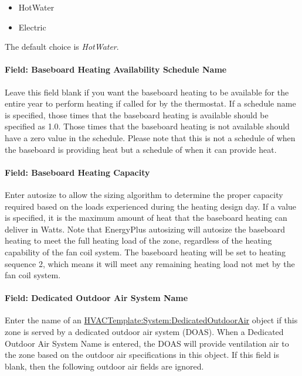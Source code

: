 \begin{itemize}
\item
  HotWater
\item
  Electric
\end{itemize}

The default choice is \emph{HotWater}.

\paragraph{Field: Baseboard Heating Availability Schedule Name}\label{field-baseboard-heating-availability-schedule-name}

Leave this field blank if you want the baseboard heating to be available for the entire year to perform heating if called for by the thermostat. If a schedule name is specified, those times that the baseboard heating is available should be specified as 1.0. Those times that the baseboard heating is not available should have a zero value in the schedule. Please note that this is not a schedule of when the baseboard is providing heat but a schedule of when it can provide heat.

\paragraph{Field: Baseboard Heating Capacity}\label{field-baseboard-heating-capacity}

Enter autosize to allow the sizing algorithm to determine the proper capacity required based on the loads experienced during the heating design day. If a value is specified, it is the maximum amount of heat that the baseboard heating can deliver in Watts. Note that EnergyPlus autosizing will autosize the baseboard heating to meet the full heating load of the zone, regardless of the heating capability of the fan coil system. The baseboard heating will be set to heating sequence 2, which means it will meet any remaining heating load not met by the fan coil system.

\paragraph{Field: Dedicated Outdoor Air System Name}\label{field-dedicated-outdoor-air-system-name}

Enter the name of an \hyperref[hvactemplatesystemdedicatedoutdoorair]{HVACTemplate:System:DedicatedOutdoorAir} object if this zone is served by a dedicated outdoor air system (DOAS). When a Dedicated Outdoor Air System Name is entered, the DOAS will provide ventilation air to the zone based on the outdoor air specifications in this object. If this field is blank, then the following outdoor air fields are ignored.


